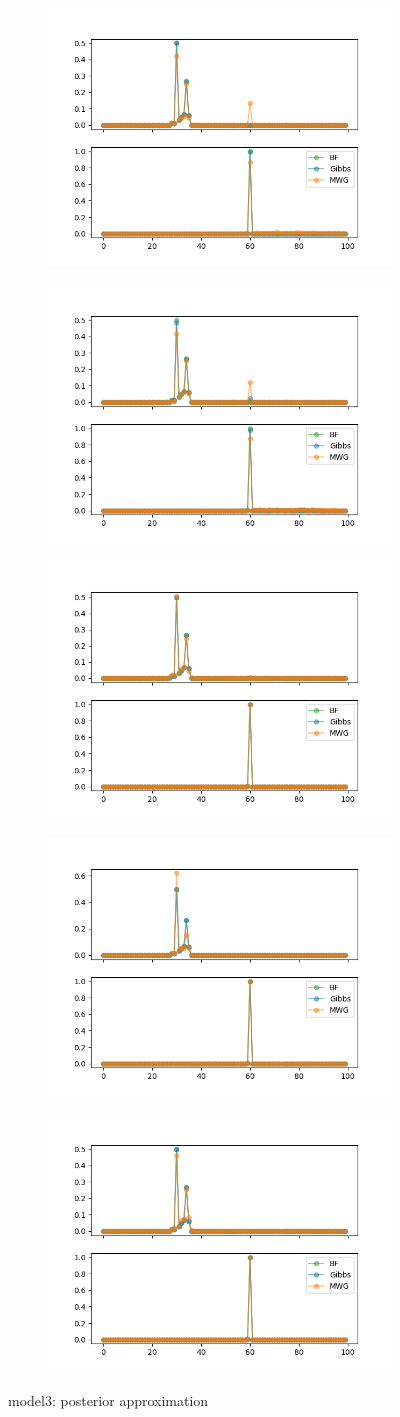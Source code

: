 \begin{figure}[h]
    \centering
    \begin{subfigure}
    	\centering
        \includegraphics[width=0.3\linewidth]{../../plots/Posterior_M3_N100_NMCMC3_seed0_diffind2.png}
    \end{subfigure}
    \begin{subfigure}
        \centering
    	\includegraphics[width=0.3\linewidth]{../../plots/Posterior_M3_N100_NMCMC3_seed1_diffind2.png}
	\end{subfigure}
	\begin{subfigure}
	    \centering
    	\includegraphics[width=0.3\linewidth]{../../plots/Posterior_M3_N100_NMCMC3_seed2_diffind2.png}
	\end{subfigure}
	\begin{subfigure}
	    \centering
    	\includegraphics[width=0.3\linewidth]{../../plots/Posterior_M3_N100_NMCMC3_seed3_diffind2.png}
	\end{subfigure}
	\begin{subfigure}
	    \centering
    	\includegraphics[width=0.3\linewidth]{../../plots/Posterior_M3_N100_NMCMC3_seed4_diffind2.png}
	\end{subfigure}
	\caption{model3: posterior approximation}
\end{figure}

